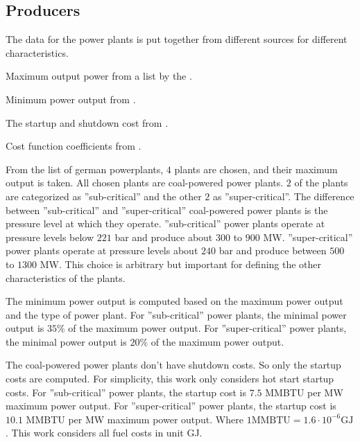 \subsection{Producers}

The data for the power plants is put together from different sources for different characteristics.
\begin{enumerate*}[label=(\roman*)]
  \item Maximum output power from a list by the \citeauthor{Kraftwerkliste2020}. \cite{Kraftwerkliste2020}
  \item Minimum power output from \cite{Schroder2013}.
  \item The startup and shutdown cost from \cite{Kumar2012}.
  \item Cost function coefficients from \cite{Alrashidi2009}.
\end{enumerate*}

From the list of german powerplants, $4$ plants are chosen, and their maximum output is taken.
All chosen plants are coal-powered power plants.
\cite{Kraftwerkliste2020}
$2$ of the plants are categorized as ''sub-critical'' and the other $2$ as ''super-critical''.
The difference between ''sub-critical'' and ''super-critical'' coal-powered power plants is the pressure level at which they operate.
''sub-critical'' power plants operate at pressure levels below $221$ bar and produce about $300$ to $900$ MW.
''super-critical'' power plants operate at pressure levels about $240$ bar and produce between $500$ to $1300$ MW.
\cite{Kumar2012, Schroder2013}
This choice is arbitrary but important for defining the other characteristics of the plants.

The minimum power output is computed based on the maximum power output and the type of power plant.
For ''sub-critical'' power plants, the minimal power output is $35\%$ of the maximum power output.
For ''super-critical'' power plants, the minimal power output is $20\%$ of the maximum power output.
\cite{Schroder2013}

The coal-powered power plants don't have shutdown costs.
So only the startup costs are computed.
For simplicity, this work only considers hot start startup costs.
For ''sub-critical'' power plants, the startup cost is $7.5$ MMBTU per MW maximum power output.
For ''super-critical'' power plants, the startup cost is $10.1$ MMBTU per MW maximum power output.
\cite{Kumar2012}
Where $1 \text{MMBTU} = 1.6 \cdot 10^{-6} \text{GJ}$.
This work considers all fuel costs in unit GJ.

